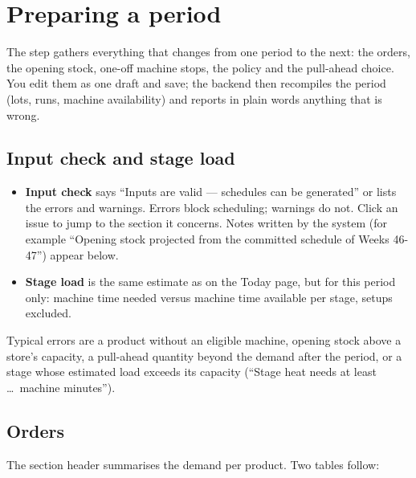 \chapter{Preparing a period}\label{ch:prepare}

The  step gathers everything that changes from one period to the next: the orders, the opening
stock, one-off machine stops, the policy and the pull-ahead choice. You edit them as one draft and save; the
backend then recompiles the period (lots, runs, machine availability) and reports in plain words anything
that is wrong.

\section{Input check and stage load}


\begin{itemize}
  \item \textbf{Input check} says ``Inputs are valid --- schedules can be generated'' or lists the errors and
        warnings. Errors block scheduling; warnings do not. Click an issue to jump to the section it concerns.
        Notes written by the system (for example ``Opening stock projected from the committed schedule of
        Weeks 46-47'') appear below.
  \item \textbf{Stage load} is the same estimate as on the Today page, but for this period only: machine time
        needed versus machine time available per stage, setups excluded.
\end{itemize}

Typical errors are a product without an eligible machine, opening stock above a store's capacity, a pull-ahead
quantity beyond the demand after the period, or a stage whose estimated load exceeds its capacity (``Stage
heat needs at least \dots\ machine minutes'').

\section{Orders}\label{sec:period-orders}


The section header summarises the demand per product. Two tables follow:

